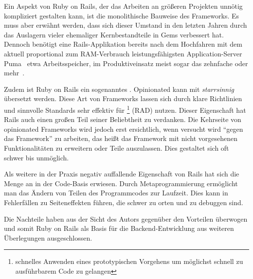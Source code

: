 Ein Aspekt von Ruby on Rails, der das Arbeiten an größeren Projekten unnötig
kompliziert gestalten kann, ist die monolithische Bauweise des Frameworks.  Es
muss aber erwähnt werden, dass sich dieser Umstand in den letzten Jahren durch
das Auslagern vieler ehemaliger Kernbestandteile in Gems verbessert hat.
Dennoch benötigt eine Rails-Applikation bereits nach dem Hochfahren mit dem
aktuell proportional zum RAM-Verbrauch leistungsfähigsten Application-Server
Puma~\cite{puma} etwa  Arbeitsspeicher, im Produktiveinsatz meist
sogar das zehnfache oder mehr~\cite{railsappservercomparison}.

Zudem ist Ruby on Rails ein sogenanntes .
Opinionated kann mit \emph{starrsinnig} übersetzt werden.  Diese Art von
Frameworks lassen sich durch klare Richtlinien und sinnvolle Standards sehr
effektiv für \footnote{schnelles
Anwenden eines prototypischen Vorgehens um möglichst schnell zu ausführbarem
Code zu gelangen} (RAD) nutzen. Dieser Eigenschaft hat Rails auch einen großen
Teil seiner Beliebtheit zu verdanken.  Die Kehrseite von opinionated Frameworks
wird jedoch erst ersichtlich, wenn versucht wird \enquote{gegen das Framework}
zu arbeiten, das heißt das Framework mit nicht vorgesehenen Funktionalitäten zu
erweitern oder Teile auszulassen.  Dies gestaltet sich oft schwer bis
unmöglich.

Als weitere in der Praxis negativ auffallende Eigenschaft von Rails hat
sich die Menge an  in der Code-Basis erwiesen.
Durch Metaprogrammierung ermöglicht man das Ändern von Teilen des Programmcodes
zur Laufzeit. Dies kann in Fehlerfällen zu Seiteneffekten führen, die schwer zu
orten und zu debuggen sind.

Die Nachteile haben aus der Sicht des Autors gegenüber den Vorteilen überwogen
und somit Ruby on Rails als Basis für die Backend-Entwicklung aus weiteren
Überlegungen ausgeschlossen.

